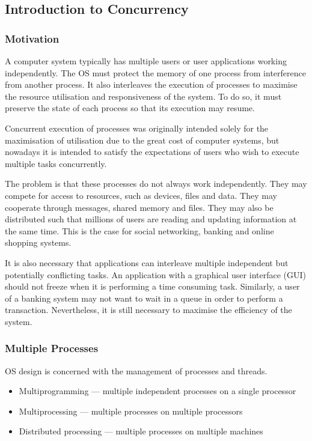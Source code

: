 \subsection{Introduction to Concurrency}

\subsubsection{Motivation}

A computer system typically has multiple users or user applications working independently.
The OS must protect the memory of one process from interference from another process.
It also interleaves the execution of processes to maximise the resource utilisation and responsiveness of the system.
To do so, it must preserve the state of each process so that its execution may resume.

Concurrent execution of processes was originally intended solely for the maximisation of utilisation due to the great cost of computer systems, but nowadays it is intended to satisfy the expectations of users who wish to execute multiple tasks concurrently.

The problem is that these processes do not always work independently.
They may compete for access to resources, such as devices, files and data.
They may cooperate through messages, shared memory and files.
They may also be distributed such that millions of users are reading and updating information at the same time.
This is the case for social networking, banking and online shopping systems.

It is also necessary that applications can interleave multiple independent but potentially conflicting tasks.
An application with a graphical user interface (GUI) should not freeze when it is performing a time consuming task.
Similarly, a user of a banking system may not want to wait in a queue in order to perform a transaction.
Nevertheless, it is still necessary to maximise the efficiency of the system.

\subsubsection{Multiple Processes}

OS design is concerned with the management of processes and threads.
\begin{itemize}
  \item Multiprogramming --- multiple independent processes on a single processor
  \item Multiprocessing --- multiple processes on multiple processors
  \item Distributed processing --- multiple processes on multiple machines
\end{itemize}

